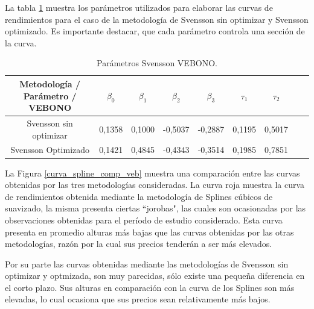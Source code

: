 \newpage

\hspace{0.4cm} La tabla \ref{tabla5} muestra los par\'ametros utilizados para elaborar las curvas de rendimientos para el caso de la metodolog\'ia de Svensson sin optimizar y Svensson optimizado. Es importante destacar, que cada par\'ametro controla una secci\'on de la curva.

\begin{table}[H]
\centering
{\begin{tabular}[t]{|c |c |c |c |c |c |c |c |r|}
\hline
Metodolog\'ia / Par\'ametro / VEBONO & $\beta_{0}$ & $\beta_{1}$ & $\beta_{2}$ & $\beta_{3}$  &  $\tau_{1}$ & $\tau_{2}$ \\
\hline
Svensson sin optimizar & 0,1358 & 0,1000 & -0,5037 & -0,2887 & 0,1195 & 0,5017\\
\hline
Svensson Optimizado & 0,1421 & 0,4845 & -0,4343 & -0,3514 & 0,1985 & 0,7851 \\
\hline
\end{tabular}}
\caption{Par\'ametros Svensson VEBONO.}
\label{tabla5}
\end{table}

\vspace{0.5cm}

\hspace{0.4cm} La Figura \ref{curva_spline_comp_veb} muestra una comparaci\'on entre las curvas obtenidas por las tres metodolog\'ias consideradas. La curva roja muestra la curva de rendimientos obtenida mediante la metodolog\'ia de Splines c\'ubicos de suavizado, la misma presenta ciertas ``jorobas", las cuales son ocasionadas por las observaciones obtenidas para el per\'iodo de estudio considerado. Esta curva presenta en promedio alturas m\'as bajas que las curvas obtenidas por las otras metodolog\'ias, raz\'on por la cual sus precios tender\'an a ser m\'as elevados.

\hspace{0.4cm} Por su parte las curvas obtenidas mediante las metodolog\'ias de Svensson sin optimizar y optmizada, son muy parecidas, s\'olo existe una peque\~na diferencia en el corto plazo. Sus alturas en comparaci\'on con la curva de los Splines son m\'as elevadas, lo cual ocasiona que sus precios sean relativamente m\'as bajos.

\newpage

